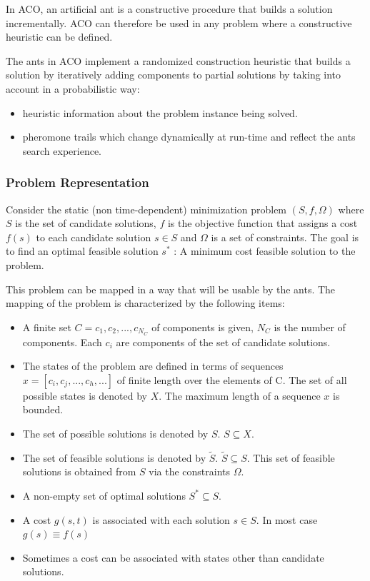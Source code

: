 In ACO, an artificial ant is a constructive procedure that builds a solution incrementally. ACO can therefore be used in any problem where a constructive heuristic can be defined.

The ants in ACO implement a randomized construction heuristic that builds a solution by iteratively adding components to partial solutions by taking into account in a probabilistic way:
\begin{itemize}
	\item heuristic information about the problem instance being solved.
	\item pheromone trails which change dynamically at run-time and reflect the ants search experience.
\end{itemize}


\subsubsection{Problem Representation}
Consider the static (non time-dependent) minimization problem $(S,f,\Omega)$ where $S$ is the set of candidate solutions, $f$ is the objective function that assigns a cost $f(s)$ to each candidate solution $s \in S$ and $\Omega$ is a set of constraints.
The goal is to find an optimal feasible solution $s^*$ : A minimum cost feasible solution to the problem.

This problem can be mapped in a way that will be usable by the ants. The mapping of the problem is characterized by the following items\cite{dorigo2004ant}:
\begin{itemize}
	\item A finite set $C = {c_1,c_2,...,c_{N_C}}$ of components is given, $N_C$ is the number of components. Each $c_i$ are components of the set of candidate solutions.
	\item The states of the problem are defined in terms of sequences $x = [c_i, c_j, ...,c_h,...]$ of finite length over the elements of C. The set of all possible states is denoted by $X$. The maximum length of a sequence $x$ is bounded.
	\item The set of possible solutions is denoted by $S$. $S \subseteq X$.
	\item The set of feasible solutions is denoted by $\tilde{S}$. $\tilde{S} \subseteq S$. This set of feasible solutions is obtained from $S$ via the constraints $\Omega$.
	\item A non-empty set of optimal solutions $S^* \subseteq S$.
	\item A cost $g(s,t)$ is associated with each solution $s \in S$. In most case $g(s) \equiv f(s)$
	\item Sometimes a cost can be associated with states other than candidate solutions.
\end{itemize}

